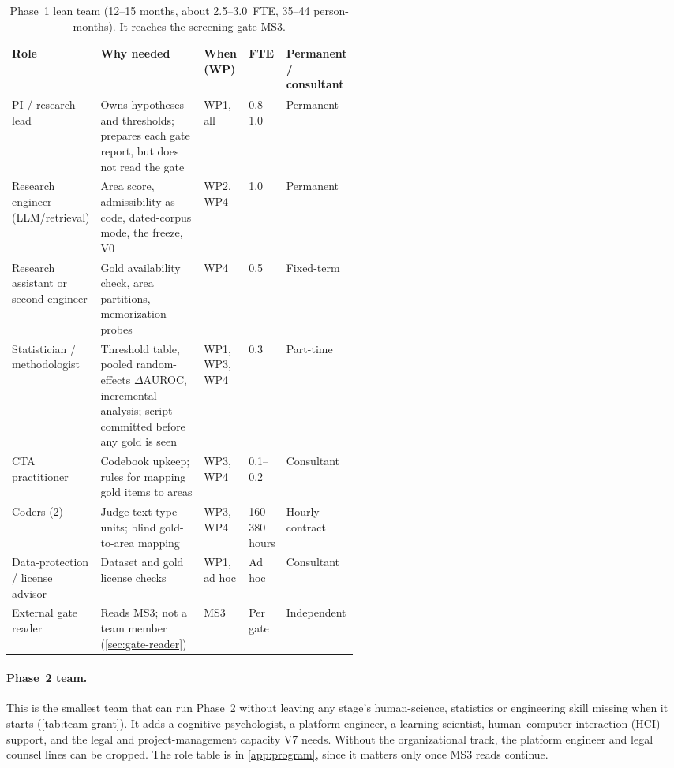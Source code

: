 \begin{table}[htbp]
  \centering
  \footnotesize
  \caption{Phase~1 lean team (12--15 months, about 2.5--3.0~FTE, 35--44 person-months). It
    reaches the screening gate MS3.}
  \label{tab:team-lean}
  \begin{tabularx}{\linewidth}{@{}p{0.19\linewidth}Xp{0.13\linewidth}p{0.07\linewidth}p{0.12\linewidth}@{}}
    \toprule
    Role & Why needed & When (WP) & FTE & Permanent / consultant \\
    \midrule
    PI / research lead &
      Owns hypotheses and thresholds; prepares each gate report, but does not read the gate &
      WP1, all & 0.8--1.0 & Permanent \\
    Research engineer (LLM/retrieval) &
      Area score, admissibility as code, dated-corpus mode, the freeze, V0 &
      WP2, WP4 & 1.0 & Permanent \\
    Research assistant or second engineer &
      Gold availability check, area partitions, memorization probes &
      WP4 & 0.5 & Fixed-term \\
    Statistician / methodologist &
      Threshold table, pooled random-effects $\Delta$AUROC, incremental analysis; script
      committed before any gold is seen &
      WP1, WP3, WP4 & 0.3 & Part-time \\
    CTA practitioner &
      Codebook upkeep; rules for mapping gold items to areas &
      WP3, WP4 & 0.1--0.2 & Consultant \\
    Coders (2) &
      Judge text-type units; blind gold-to-area mapping &
      WP3, WP4 & 160--380 hours & Hourly contract \\
    Data-protection / license advisor &
      Dataset and gold license checks &
      WP1, ad hoc & Ad hoc & Consultant \\
    External gate reader &
      Reads MS3; not a team member (\cref{sec:gate-reader}) &
      MS3 & Per gate & Independent \\
    \bottomrule
  \end{tabularx}
\end{table}

\paragraph{Phase~2 team.} \evint{} This is the smallest team that can run Phase~2 without leaving
any stage's human-science, statistics or engineering skill missing when it starts
(\cref{tab:team-grant}). It adds a cognitive psychologist, a platform engineer, a learning
scientist, human--computer interaction (HCI) support, and the legal and project-management capacity V7 needs. Without the
organizational track, the platform engineer and legal counsel lines can be dropped. The role
table is in \cref{app:program}, since it matters only once MS3 reads continue.


